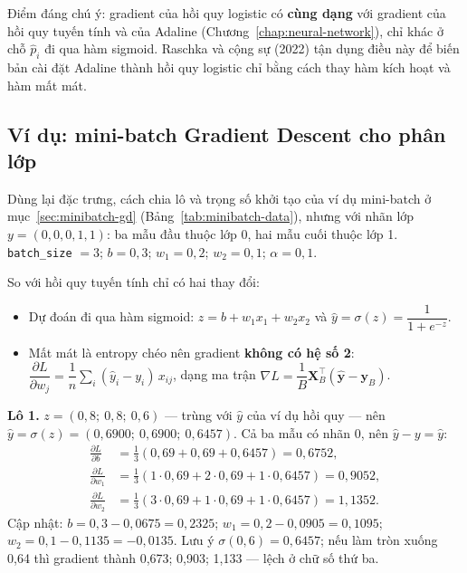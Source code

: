 Điểm đáng chú ý: gradient của hồi quy logistic có \textbf{cùng dạng} với gradient của hồi quy tuyến tính và của Adaline (Chương~\ref{chap:neural-network}), chỉ khác ở chỗ $\hat{p}_i$ đi qua hàm sigmoid. Raschka và cộng sự (2022) tận dụng điều này để biến bản cài đặt Adaline thành hồi quy logistic chỉ bằng cách thay hàm kích hoạt và hàm mất mát.

\subsection{Ví dụ: mini-batch Gradient Descent cho phân lớp}
\label{sec:minibatch-logreg}

\begin{example}
Dùng lại đặc trưng, cách chia lô và trọng số khởi tạo của ví dụ mini-batch ở mục~\ref{sec:minibatch-gd} (Bảng~\ref{tab:minibatch-data}), nhưng với nhãn lớp $y = (0, 0, 0, 1, 1)$: ba mẫu đầu thuộc lớp 0, hai mẫu cuối thuộc lớp 1. \texttt{batch\_size} $= 3$; $b = 0{,}3$; $w_1 = 0{,}2$; $w_2 = 0{,}1$; $\alpha = 0{,}1$.
\end{example}

So với hồi quy tuyến tính chỉ có hai thay đổi:
\begin{itemize}
    \item Dự đoán đi qua hàm sigmoid: $z = b + w_1 x_1 + w_2 x_2$ và $\hat{y} = \sigma(z) = \dfrac{1}{1 + e^{-z}}$.
    \item Mất mát là entropy chéo nên gradient \textbf{không có hệ số 2}: $\dfrac{\partial L}{\partial w_j} = \dfrac{1}{n}\sum_i(\hat{y}_i - y_i)\,x_{ij}$, dạng ma trận $\nabla L = \dfrac{1}{B}\mathbf{X}_B^\top(\hat{\mathbf{y}} - \mathbf{y}_B)$.
\end{itemize}

\noindent\textbf{Lô 1.} $z = (0{,}8;\ 0{,}8;\ 0{,}6)$ --- trùng với $\hat{y}$ của ví dụ hồi quy --- nên $\hat{y} = \sigma(z) = (0{,}6900;\ 0{,}6900;\ 0{,}6457)$. Cả ba mẫu có nhãn 0, nên $\hat{y} - y = \hat{y}$:
\begin{align*}
    \frac{\partial L}{\partial b} &= \tfrac{1}{3}(0{,}69 + 0{,}69 + 0{,}6457) = 0{,}6752,\\
    \frac{\partial L}{\partial w_1} &= \tfrac{1}{3}(1 \cdot 0{,}69 + 2 \cdot 0{,}69 + 1 \cdot 0{,}6457) = 0{,}9052,\\
    \frac{\partial L}{\partial w_2} &= \tfrac{1}{3}(3 \cdot 0{,}69 + 1 \cdot 0{,}69 + 1 \cdot 0{,}6457) = 1{,}1352.
\end{align*}
Cập nhật: $b = 0{,}3 - 0{,}0675 = 0{,}2325$; $w_1 = 0{,}2 - 0{,}0905 = 0{,}1095$; $w_2 = 0{,}1 - 0{,}1135 = -0{,}0135$. Lưu ý $\sigma(0{,}6) = 0{,}6457$; nếu làm tròn xuống 0,64 thì gradient thành 0,673; 0,903; 1,133 --- lệch ở chữ số thứ ba.

